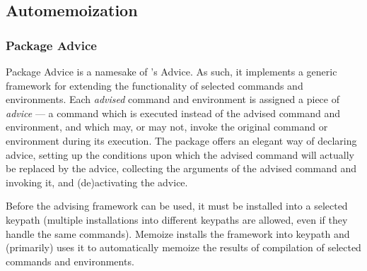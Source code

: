 \documentclass[a4paper,11pt]{article}
\begin{document}
\subsection{Automemoization}
\label{sec:ref:advicememoization}


\subsubsection{Package Advice}
\label{sec:ref:advice}

Package Advice is a namesake of \Emacs's Advice.  As such, it implements a
generic framework for extending the functionality of selected commands and
environments.  Each \emph{advised} command and environment is assigned a piece
of \emph{advice} --- a command which is executed instead of the advised command
and environment, and which may, or may not, invoke the original command or
environment during its execution.  The package offers an elegant way of
declaring advice, setting up the conditions upon which the advised command will
actually be replaced by the advice, collecting the arguments of the advised
command and invoking it, and (de)activating the advice.

Before the advising framework can be used, it must be installed into a selected
 keypath (multiple installations into different keypaths are
allowed, even if they handle the same commands).  Memoize installs the
framework into keypath  and (primarily) uses it to
automatically memoize the results of compilation of selected commands and
environments.
\end{document}
